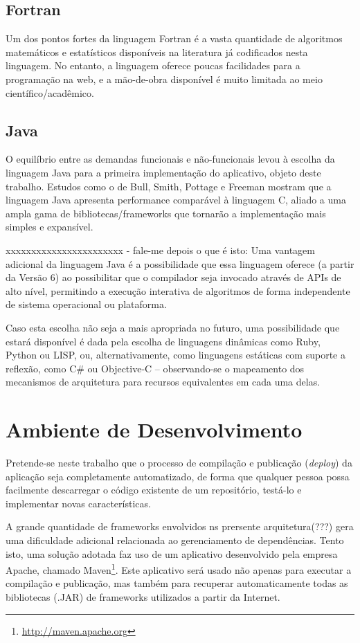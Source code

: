\documentclass{abnt}
\begin{document}
\subsection{Fortran}
	Um dos pontos fortes da linguagem Fortran é a vasta quantidade de algoritmos matemáticos e estatísticos disponíveis na literatura já codificados nesta linguagem. No entanto, a linguagem oferece poucas facilidades para a programação na web, e a mão-de-obra disponível é muito limitada ao meio científico/acadêmico.

	\subsection{Java}
	O equilíbrio entre as demandas funcionais e não-funcionais levou à escolha da linguagem Java para a primeira implementação do aplicativo, objeto deste trabalho. Estudos como o de Bull, Smith, Pottage e Freeman\cite{BullSmithPottageFreeman} mostram que a linguagem Java apresenta performance comparável à linguagem C, aliado a uma ampla gama de bibliotecas/frameworks que tornarão a implementação mais simples e expansível.

xxxxxxxxxxxxxxxxxxxxxxx - fale-me depois o que é isto:
	Uma vantagem adicional da linguagem Java é a possibilidade que essa linguagem oferece (a partir da Versão 6) ao possibilitar que o compilador seja invocado através de APIs de alto nível, permitindo a execução interativa de algoritmos de forma independente de sistema operacional ou plataforma.

	Caso esta escolha não seja a mais apropriada no futuro, uma possibilidade que estará disponível é dada pela escolha de linguagens dinâmicas como Ruby, Python ou LISP, ou, alternativamente, como linguagens estáticas com suporte a reflexão, como C\# ou Objective-C – observando-se o mapeamento dos mecanismos de arquitetura para recursos equivalentes em cada uma delas.

\section{Ambiente de Desenvolvimento}

	Pretende-se neste trabalho que o processo de compilação e publicação (\textit{deploy}) da aplicação seja completamente automatizado, de forma que qualquer pessoa possa facilmente descarregar o código existente de um repositório, testá-lo e implementar novas características.

	A grande quantidade de frameworks envolvidos ns prersente arquitetura(???) gera uma dificuldade adicional relacionada ao gerenciamento de dependências. Tento isto, uma solução adotada faz uso de um aplicativo desenvolvido pela empresa Apache, chamado  Maven\footnote{\url{http://maven.apache.org}}. Este aplicativo será usado não apenas para executar a compilação e publicação, mas também para recuperar automaticamente todas as bibliotecas (.JAR) de frameworks utilizados a partir da Internet.
\end{document}
